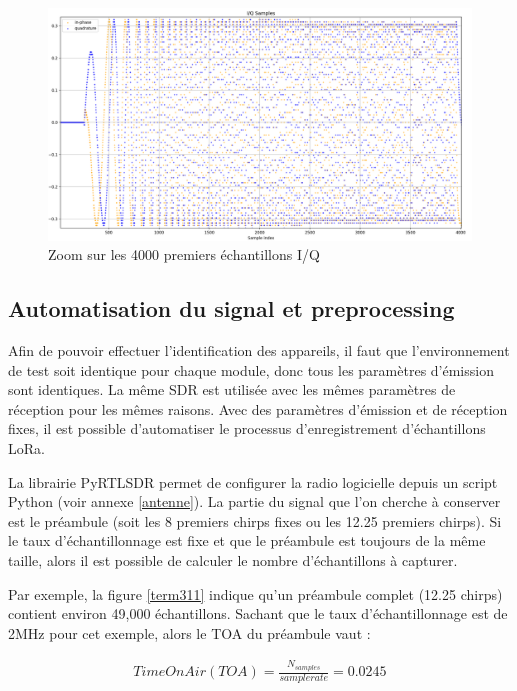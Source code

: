\newpage

\begin{figure}[h]
\centering

\includegraphics[scale=0.13]{images/iq2.png}
\caption{Zoom sur les 4000 premiers échantillons I/Q}\label{term310}
\end{figure}

\subsection{Automatisation du signal et preprocessing}

Afin de pouvoir effectuer l'identification des appareils, il faut que l'environnement de test soit identique pour chaque module, donc tous les paramètres d'émission sont identiques. La même \ac{SDR} est utilisée avec les mêmes paramètres de réception pour les mêmes raisons. Avec des paramètres d'émission et de réception fixes, il est possible d'automatiser le processus d'enregistrement d'échantillons \ac{LoRa}.

La librairie PyRTLSDR permet de configurer la radio logicielle depuis un script Python (voir annexe \ref{antenne}). La partie du signal que l'on cherche à conserver est le préambule (soit les 8 premiers chirps fixes ou les 12.25 premiers chirps). Si le taux d'échantillonnage est fixe et que le préambule est toujours de la même taille, alors il est possible de calculer le nombre d'échantillons à capturer. 

Par exemple, la figure \ref{term311} indique qu'un préambule complet (12.25 chirps) contient environ 49,000 échantillons. Sachant que le taux d'échantillonnage est de 2MHz pour cet exemple, alors le \ac{TOA} du préambule vaut :

\begin{align}\label{toa}
    Time On Air (TOA) = \frac{N_{samples}}{sample rate} = 0.0245
\end{align}


